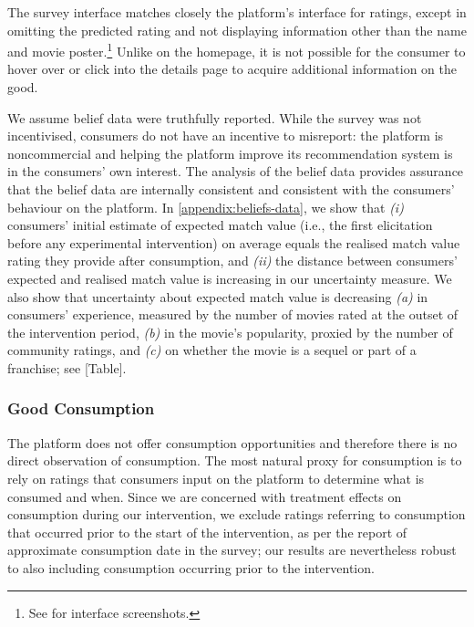 \documentclass[12pt]{article}
\theoremstyle{newtheorem}
\begin{document}
The survey interface matches closely the platform's interface for ratings, except in omitting the predicted rating and not displaying information other than the name and movie poster.\footnote{
    See  for interface screenshots.
} 
Unlike on the homepage, it is not possible for the consumer to hover over or click into the details page to acquire additional information on the good. 


We assume belief data were truthfully reported. 
While the survey was not incentivised, consumers do not have an incentive to misreport: the platform is noncommercial and helping the platform improve its recommendation system is in the consumers' own interest. 
The analysis of the belief data provides assurance that the belief data are internally consistent and consistent with the consumers' behaviour on the platform.
In \ref{appendix:beliefs-data}, we show that \emph{(i)} consumers' initial estimate of expected match value (i.e., the first elicitation before any experimental intervention) on average equals the realised match value rating they provide after consumption, and \emph{(ii)} the distance between consumers' expected and realised match value is increasing in our uncertainty measure.
We also show that uncertainty about expected match value is decreasing \emph{(a)} in consumers' experience, measured by the number of movies rated at the outset of the intervention period, \emph{(b)} in the movie's popularity, proxied by the number of community ratings, and \emph{(c)} on whether the movie is a sequel or part of a franchise; see [Table].



\subsubsection{Good Consumption}
\label{section:design:measurements:consumption}
The platform does not offer consumption opportunities and therefore there is no direct observation of consumption.
The most natural proxy for consumption is to rely on ratings that consumers input on the platform to determine what is consumed and when. 
Since we are concerned with treatment effects on consumption during our intervention, we exclude ratings referring to consumption that occurred prior to the start of the intervention, as per the report of approximate consumption date in the survey; our results are nevertheless robust to also including consumption occurring prior to the intervention.
\end{document}
